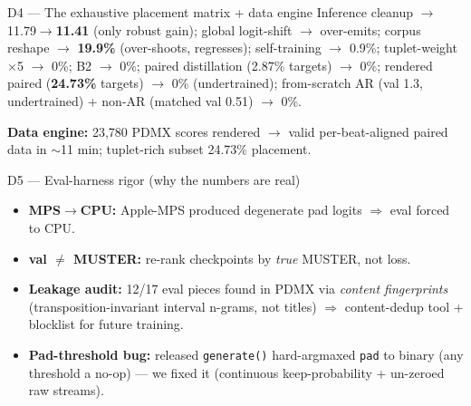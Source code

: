 \documentclass[aspectratio=169,11pt]{beamer}
\begin{document}
\begin{frame}{D4 --- The exhaustive placement matrix + data engine}
  \footnotesize
  Inference cleanup $\to$ 11.79$\to$\textbf{11.41} (only robust gain); global logit-shift $\to$ over-emits; corpus reshape $\to$ \textbf{19.9\%} (over-shoots, regresses); self-training $\to$ 0.9\%; tuplet-weight $\times$5 $\to$ 0\%; B2 $\to$ 0\%; paired distillation (2.87\% targets) $\to$ 0\%; rendered paired (\textbf{24.73\%} targets) $\to$ 0\% (undertrained); from-scratch AR (val 1.3, undertrained) + non-AR (matched val 0.51) $\to$ 0\%.\par\smallskip
  \textbf{Data engine:} 23{,}780 PDMX scores rendered $\to$ valid per-beat-aligned paired data in $\sim$11 min; tuplet-rich subset 24.73\% placement.
\end{frame}

\begin{frame}{D5 --- Eval-harness rigor (why the numbers are real)}
  \footnotesize
  \begin{itemize}
    \item \textbf{MPS$\to$CPU:} Apple-MPS produced degenerate pad logits $\Rightarrow$ eval forced to CPU.
    \item \textbf{val $\neq$ MUSTER:} re-rank checkpoints by \emph{true} MUSTER, not loss.
    \item \textbf{Leakage audit:} 12/17 eval pieces found in PDMX via \emph{content fingerprints} (transposition-invariant interval n-grams, not titles) $\Rightarrow$ content-dedup tool + blocklist for future training.
    \item \textbf{Pad-threshold bug:} released \texttt{generate()} hard-argmaxed \texttt{pad} to binary (any threshold a no-op) --- we fixed it (continuous keep-probability + un-zeroed raw streams).
  \end{itemize}
\end{frame}
\end{document}
